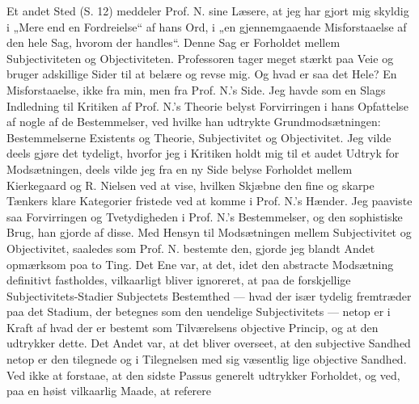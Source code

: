 \documentclass[12pt,a4paper]{book}
\newcommand{\opage}[1]{\marginnote{\footnotesize\textit{[#1]}}}
\begin{document}
Et andet Sted (S. 12) meddeler Prof. N. sine Læsere, at jeg har gjort mig skyldig
i „Mere end en Fordreielse“ af hans Ord, i „en gjennemgaaende Misforstaaelse af
den hele Sag, hvorom der handles“. Denne Sag er Forholdet mellem Subjectiviteten
og Objectiviteten. Professoren tager meget stærkt paa Veie og bruger adskillige
Sider til at belære og revse mig. Og hvad er saa det Hele? En Misforstaaelse,
ikke fra min, men fra Prof. N.'s Side. Jeg havde som en Slags Indledning til
Kritiken af Prof. N.'s Theorie belyst Forvirringen i hans Opfattelse af nogle af
de Bestemmelser, ved hvilke han udtrykte Grundmodsætningen: Bestemmelserne
Existents og Theorie, Subjectivitet og Objectivitet. Jeg vilde deels gjøre det
tydeligt, hvorfor jeg i Kritiken holdt mig til et audet Udtryk for Modsætningen,
deels vilde jeg fra en ny Side belyse Forholdet mellem Kierkegaard og R. Nielsen
ved at vise, hvilken Skjæbne den fine og skarpe Tænkers klare Kategorier fristede
ved at komme i Prof. N.'s Hænder. Jeg paaviste saa Forvirringen og Tvetydigheden
i Prof. N.'s Bestemmelser, og den sophistiske Brug, han gjorde af disse. Med
Hensyn til Modsætningen mellem Subjectivitet og Objectivitet, saaledes som
Prof. N. bestemte den, gjorde jeg blandt Andet opmærksom poa to Ting. Det Ene
var, at det, idet den abstracte Modsætning definitivt fastholdes, vilkaarligt
bliver ignoreret, at paa de forskjellige Subjectivitets-Stadier Subjectets
Bestemthed ---
\opage{17} \setcounter{footnote}{0}
hvad der især tydelig fremtræder paa det Stadium, der betegnes som den uendelige
Subjectivitets --- netop er i Kraft af hvad der er bestemt som Tilværelsens
objective Princip, og at den udtrykker dette. Det Andet var, at det bliver
overseet, at den subjective Sandhed netop er den tilegnede og i Tilegnelsen med
sig væsentlig lige objective Sandhed. Ved ikke at forstaae, at den sidste Passus
generelt udtrykker Forholdet, og ved, paa en høist vilkaarlig Maade, at referere
\end{document}
